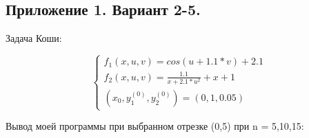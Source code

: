 \documentclass[a4paper,12pt,titlepage,finall]{article}
\begin{document}
\newpage


\subsection{Приложение 1. Вариант 2-5.}

Задача Коши:

\begin{equation*}
 \begin{cases}
   f_{1}(x, u, v) = cos(u + 1.1 * v) + 2.1
   \\
   f_{2}(x, u, v) = \frac{1.1}{x+2.1*u^{2}}+x+1
   \\
   (x_{0},y_{1}^{(0)},y_{2}^{(0)}) = (0,1,0.05)
 \end{cases}
\end{equation*}

Вывод моей программы при выбранном отрезке (0,5) при n = 5,10,15:
\end{document}
